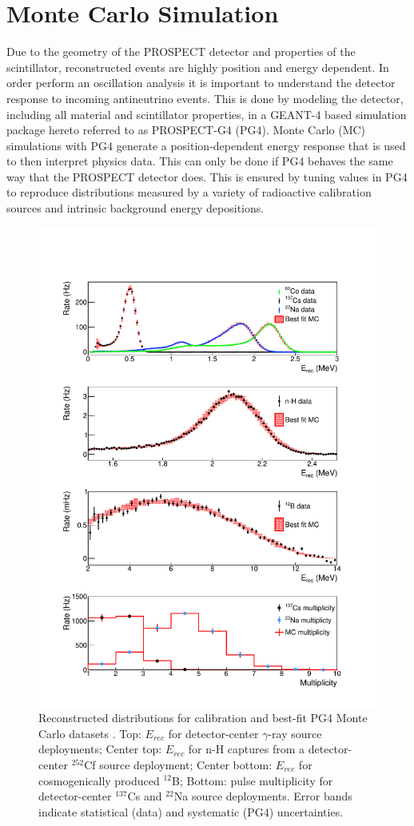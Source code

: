 \section{Monte Carlo Simulation}

Due to the geometry of the PROSPECT detector and properties of the scintillator, reconstructed events are highly position and energy dependent. 
In order perform an oscillation analysis it is important to understand the detector response to incoming antineutrino events. 
This is done by modeling the detector, including all material and scintillator properties, in a GEANT-4 based simulation package hereto referred to as PROSPECT-G4 (PG4).
Monte Carlo (MC) simulations with PG4 generate a position-dependent energy response that is used to then interpret physics data. 
This can only be done if PG4 behaves the same way that the PROSPECT detector does. 
This is ensured by tuning values in PG4 to reproduce distributions measured by a variety of radioactive calibration sources and intrinsic background energy depositions.



\begin{figure}[h]
	\centering
	\includegraphics[width=0.7\linewidth]{tex/5-analysis-images/GammaE}
	\caption[]{Reconstructed distributions for calibration and best-fit PG4 Monte Carlo datasets \cite{XZhang:2815}. Top: $E_{rec}$ for detector-center $\gamma$-ray source deployments; Center top: $E_{rec}$ for n-H captures from a detector-center $^{252}$Cf source deployment; Center bottom: $E_{rec}$ for cosmogenically produced $^{12}$B; Bottom: pulse multiplicity for detector-center $^{137}$Cs and $^{22}$Na source deployments. Error bands indicate statistical (data) and systematic (PG4) uncertainties.}
	\label{fig:gammae}
\end{figure}

